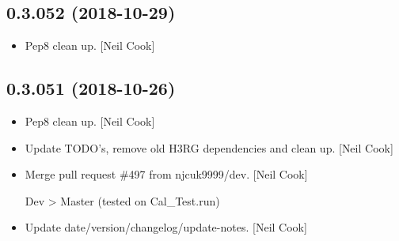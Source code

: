 \documentclass[a4paper,10pt,english]{report}
\begin{document}
\subsection{0.3.052 (2018-10-29)}
\label{\detokenize{misc/changelog:id278}}\begin{itemize}
\item {} 
Pep8 clean up. {[}Neil Cook{]}

\end{itemize}


\subsection{0.3.051 (2018-10-26)}
\label{\detokenize{misc/changelog:id279}}\begin{itemize}
\item {} 
Pep8 clean up. {[}Neil Cook{]}

\item {} 
Update TODO’s, remove old H3RG dependencies and clean up. {[}Neil Cook{]}

\item {} 
Merge pull request \#497 from njcuk9999/dev. {[}Neil Cook{]}

Dev \textendash{}\textgreater{} Master (tested on Cal\_Test.run)

\item {} 
Update date/version/changelog/update-notes. {[}Neil Cook{]}

\end{itemize}
\end{document}
